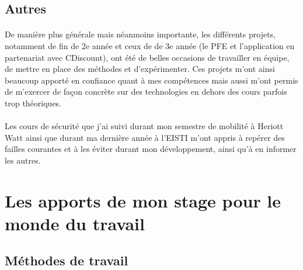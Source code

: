 \subsection{Autres}
\label{sub:Autres}
\paragraph{}
De manière plus générale mais néanmoins importante, les différents projets, notamment de fin de 2e année et ceux de de 3e année (le PFE et l'application en partenariat avec CDiscount), ont été de belles occasions de travailler en équipe, de mettre en place des méthodes et d'expérimenter.
Ces projets m'ont ainsi beaucoup apporté en confiance quant à mes compétences mais aussi m'ont permis de m'exercer de façon concrète sur des technologies en dehors des cours parfois trop théoriques.
\paragraph{}
Les cours de sécurité que j'ai suivi durant mon semestre de mobilité à Heriott Watt ainsi que durant ma dernière année à l'EISTI m'ont appris à repérer des failles courantes et à les éviter durant mon développement, ainsi qu'à en informer les autres.

\section{Les apports de mon stage pour le monde du travail}
\subsection{Méthodes de travail}
\label{sub:Méthodes de travail}
